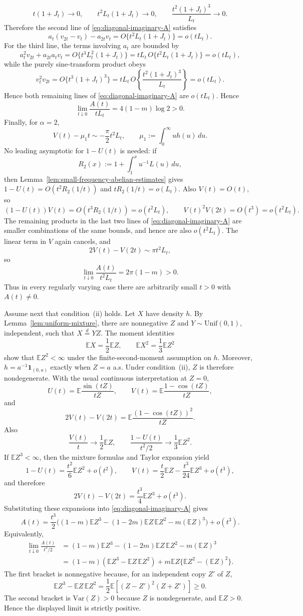 \documentclass[aap,press]{apt} \volno{00} \partno{00}
\newcommand{\E}{\mathbb{E}}
\newcommand{\1}{\mathbf{1}}
\numberwithin{equation}{section}
\begin{document}
\[
t(1+J_t)\to0,
\qquad
 t^2L_t(1+J_t)\to0,
\qquad
\frac{t^2(1+J_t)^3}{L_t}\to0 .
\]
Therefore the second line of \eqref{eq:diagonal-imaginary-A} satisfies
\[
a_t(v_{2t}-v_t)-a_{2t}v_t
=
O\{t^2L_t(1+J_t)\}
=
o(tL_t).
\]
For the third line, the terms involving $a_t$ are bounded by
\[
a_t^2v_{2t}+a_{2t}a_tv_t
=
O\{t^3L_t^2(1+J_t)\}
=
tL_t\,O\{t^2L_t(1+J_t)\}
=
o(tL_t),
\]
while the purely sine-transform product obeys
\[
v_t^2v_{2t}
=
O\{t^3(1+J_t)^3\}
=
tL_t\,O\!\left\{\frac{t^2(1+J_t)^3}{L_t}\right\}
=
o(tL_t).
\]
Hence both remaining lines of \eqref{eq:diagonal-imaginary-A} are $o(tL_t)$. Hence
\[
\lim_{t\downarrow0}\frac{A(t)}{tL_t}=4(1-m)\log2>0.
\]
Finally, for $\alpha=2$,
\[
V(t)-\mu_1t\sim -\frac{\pi}{2}t^2L_t,
\qquad
\mu_1:=\int_0^\infty u h(u)\,du.
\]
No leading asymptotic for $1-U(t)$ is needed: if
\[
R_2(x):=1+\int_1^x u^{-1}L(u)\,du,
\]
then Lemma~\ref{lem:small-frequency-abelian-estimates} gives $1-U(t)=O(t^2R_2(1/t))$ and $tR_2(1/t)=o(L_t)$. Also $V(t)=O(t)$, so
\[
(1-U(t))V(t)=O(t^3R_2(1/t))=o(t^2L_t),
\qquad
V(t)^2V(2t)=O(t^3)=o(t^2L_t).
\]
The remaining products in the last two lines of \eqref{eq:diagonal-imaginary-A} are smaller combinations of the same bounds, and hence are also $o(t^2L_t)$. The linear term in $V$ again cancels, and
\[
2V(t)-V(2t)\sim \pi t^2L_t,
\]
so
\[
\lim_{t\downarrow0}\frac{A(t)}{t^2L_t}=2\pi(1-m)>0.
\]
Thus in every regularly varying case there are arbitrarily small $t>0$ with $A(t)\neq0$.

Assume next that condition~(ii) holds. Let $X$ have density $h$. By Lemma~\ref{lem:uniform-mixture}, there are nonnegative $Z$ and $Y\sim \mathrm{Unif}(0,1)$, independent, such that $X\stackrel d=YZ$. The moment identities
\[
\E X=\frac12\E Z,
\qquad
\E X^2=\frac13\E Z^2
\]
show that $\E Z^2<\infty$ under the finite-second-moment assumption on $h$. Moreover, $h=a^{-1}\1_{(0,a)}$ exactly when $Z=a$ a.s. Under condition~(ii), $Z$ is therefore nondegenerate. With the usual continuous interpretation at $Z=0$,
\[
U(t)=\E\frac{\sin(tZ)}{tZ},
\qquad
V(t)=\E\frac{1-\cos(tZ)}{tZ},
\]
and
\[
2V(t)-V(2t)=\E\frac{(1-\cos(tZ))^2}{tZ}.
\]
Also
\[
\frac{V(t)}{t}\to \frac{1}{2}\E Z,
\qquad
\frac{1-U(t)}{t^2/2}\to \frac{1}{3}\E Z^2.
\]
If $\E Z^3<\infty$, then the mixture formulas and Taylor expansion yield
\[
1-U(t)=\frac{t^2}{6}\E Z^2+o(t^2),
\qquad
V(t)=\frac{t}{2}\E Z-\frac{t^3}{24}\E Z^3+o(t^3),
\]
and therefore
\[
2V(t)-V(2t)=\frac{t^3}{4}\E Z^3+o(t^3).
\]
Substituting these expansions into \eqref{eq:diagonal-imaginary-A} gives
\[
A(t)
=
\frac{t^3}{2}\Big((1-m)\E Z^3-(1-2m)\E Z\,\E Z^2-m(\E Z)^3\Big)
+o(t^3).
\]
Equivalently,
\begin{align*}
\lim_{t\downarrow0}\frac{A(t)}{t^3/2}
&=(1-m)\E Z^3-(1-2m)\E Z\,\E Z^2-m(\E Z)^3 \\
&=(1-m)(\E Z^3-\E Z\,\E Z^2)+m\E Z\{\E Z^2-(\E Z)^2\}.
\end{align*}
The first bracket is nonnegative because, for an independent copy $Z'$ of $Z$,
\[
\E Z^3-\E Z\,\E Z^2
=
\frac12\E[(Z-Z')^2(Z+Z')]\ge0.
\]
The second bracket is $\mathrm{Var}(Z)>0$ because $Z$ is nondegenerate, and $\E Z>0$. Hence the displayed limit is strictly positive.
\end{document}
